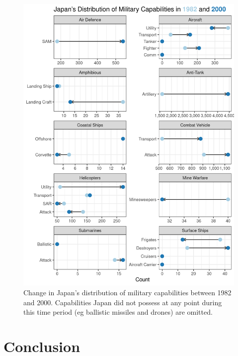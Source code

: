 \documentclass[
  12,
  letterpaper,
  DIV=11,
  numbers=noendperiod]{scrartcl}
\begin{document}
\begin{figure}[H]

{\centering \includegraphics{2023-04-04_Specialization_files/figure-pdf/fig-japan-1.png}

}

\caption{\label{fig-japan}Change in Japan's distribution of military
capabilities between 1982 and 2000. Capabilities Japan did not possess
at any point during this time period (eg ballistic missiles and drones)
are omitted.}

\end{figure}

\hypertarget{sec-conclusion}{%
\section{Conclusion}\label{sec-conclusion}}
\end{document}
